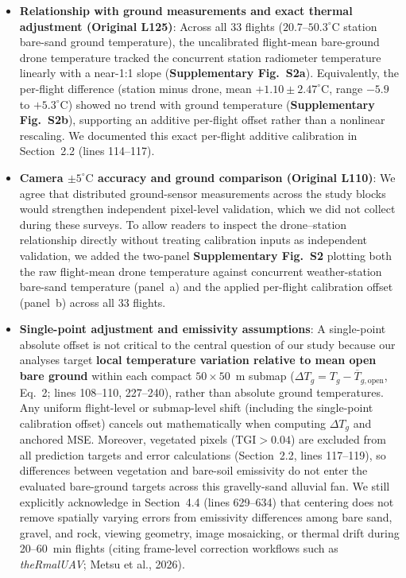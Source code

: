 \documentclass[12pt,english]{reviewresponse}
\begin{document}
\begin{revresponse}
\begin{itemize}[leftmargin=*, itemsep=0.2em]
    \item \textbf{Relationship with ground measurements and exact thermal adjustment (Original L125)}: Across all 33 flights ($20.7\text{--}50.3^\circ\mathrm{C}$ station bare-sand ground temperature), the uncalibrated flight-mean bare-ground drone temperature tracked the concurrent station radiometer temperature linearly with a near-1:1 slope (\textbf{Supplementary Fig.~S2a}). Equivalently, the per-flight difference (station minus drone, mean $+1.10 \pm 2.47^\circ\mathrm{C}$, range $-5.9$ to $+5.3^\circ\mathrm{C}$) showed no trend with ground temperature (\textbf{Supplementary Fig.~S2b}), supporting an additive per-flight offset rather than a nonlinear rescaling. We documented this exact per-flight additive calibration in Section~2.2 (lines 114--117).
    \item \textbf{Camera $\pm 5^\circ\mathrm{C}$ accuracy and ground comparison (Original L110)}: We agree that distributed ground-sensor measurements across the study blocks would strengthen independent pixel-level validation, which we did not collect during these surveys. To allow readers to inspect the drone--station relationship directly without treating calibration inputs as independent validation, we added the two-panel \textbf{Supplementary Fig.~S2} plotting both the raw flight-mean drone temperature against concurrent weather-station bare-sand temperature (panel~a) and the applied per-flight calibration offset (panel~b) across all 33 flights.
    \item \textbf{Single-point adjustment and emissivity assumptions}: A single-point absolute offset is not critical to the central question of our study because our analyses target \textbf{local temperature variation relative to mean open bare ground} within each compact $50\times 50$~m submap ($\Delta T_g = T_g - \overline{T}_{g,\text{open}}$, Eq.~2; lines 108--110, 227--240), rather than absolute ground temperatures. Any uniform flight-level or submap-level shift (including the single-point calibration offset) cancels out mathematically when computing $\Delta T_g$ and anchored MSE. Moreover, vegetated pixels ($\text{TGI} > 0.04$) are excluded from all prediction targets and error calculations (Section~2.2, lines 117--119), so differences between vegetation and bare-soil emissivity do not enter the evaluated bare-ground targets across this gravelly-sand alluvial fan. We still explicitly acknowledge in Section~4.4 (lines 629--634) that centering does not remove spatially varying errors from emissivity differences among bare sand, gravel, and rock, viewing geometry, image mosaicking, or thermal drift during 20--60~min flights (citing frame-level correction workflows such as \textit{theRmalUAV}; Metsu et al., 2026).
\end{itemize}
\end{revresponse}
\end{document}

